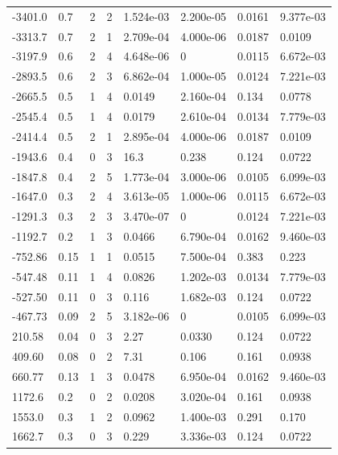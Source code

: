 \documentclass[preview]{standalone}
\begin{document}
{{\begin{tabular}{L{1.2cm}C{1.2cm} C{0.3cm}C{0.5cm} C{1.4cm}C{1.4cm} C{1.4cm}C{1.4cm}}
  -3401.0  &   0.7  & 2     &  2 &  1.524e-03  & 2.200e-05  & 0.0161 &  9.377e-03   \\ 
  -3313.7  &   0.7  & 2     &  1 &  2.709e-04  & 4.000e-06  & 0.0187 &  0.0109   \\ 
  -3197.9  &   0.6  & 2     &  4 &  4.648e-06  & 0  & 0.0115 &  6.672e-03   \\ 
  -2893.5  &   0.6  & 2     &  3 &  6.862e-04  & 1.000e-05  & 0.0124 &  7.221e-03   \\ 
  -2665.5  &   0.5  & 1     &  4 &  0.0149  & 2.160e-04  & 0.134 &  0.0778   \\ 
  -2545.4  &   0.5  & 1     &  4 &  0.0179  & 2.610e-04  & 0.0134 &  7.779e-03   \\ 
  -2414.4  &   0.5  & 2     &  1 &  2.895e-04  & 4.000e-06  & 0.0187 &  0.0109   \\ 
  -1943.6  &   0.4  & 0     &  3 &  16.3  & 0.238  & 0.124 &  0.0722   \\ 
  -1847.8  &   0.4  & 2     &  5 &  1.773e-04  & 3.000e-06  & 0.0105 &  6.099e-03   \\ 
  -1647.0  &   0.3  & 2     &  4 &  3.613e-05  & 1.000e-06  & 0.0115 &  6.672e-03   \\ 
  -1291.3  &   0.3  & 2     &  3 &  3.470e-07  & 0  & 0.0124 &  7.221e-03   \\ 
  -1192.7  &   0.2  & 1     &  3 &  0.0466  & 6.790e-04  & 0.0162 &  9.460e-03   \\ 
  -752.86  &  0.15  & 1     &  1 &  0.0515  & 7.500e-04  & 0.383 &  0.223   \\ 
  -547.48  &  0.11  & 1     &  4 &  0.0826  & 1.202e-03  & 0.0134 &  7.779e-03   \\ 
  -527.50  &  0.11  & 0     &  3 &  0.116  & 1.682e-03  & 0.124 &  0.0722   \\ 
  -467.73  &  0.09  & 2     &  5 &  3.182e-06  & 0  & 0.0105 &  6.099e-03   \\ 
  210.58  &  0.04  & 0     &  3 &  2.27  & 0.0330  & 0.124 &  0.0722   \\ 
  409.60  &  0.08  & 0     &  2 &  7.31  & 0.106  & 0.161 &  0.0938   \\ 
  660.77  &  0.13  & 1     &  3 &  0.0478  & 6.950e-04  & 0.0162 &  9.460e-03   \\ 
  1172.6  &   0.2  & 0     &  2 &  0.0208  & 3.020e-04  & 0.161 &  0.0938   \\ 
  1553.0  &   0.3  & 1     &  2 &  0.0962  & 1.400e-03  & 0.291 &  0.170   \\ 
  1662.7  &   0.3  & 0     &  3 &  0.229  & 3.336e-03  & 0.124 &  0.0722   \\ 

\end{tabular}}}
\end{document}
